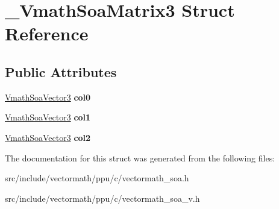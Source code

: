 \hypertarget{struct__VmathSoaMatrix3}{\section{\-\_\-\-Vmath\-Soa\-Matrix3 Struct Reference}
\label{struct__VmathSoaMatrix3}
}
\subsection*{Public Attributes}
\begin{DoxyCompactItemize}
\item 
\hypertarget{struct__VmathSoaMatrix3_a2cbc762d8f354344eb4dcfbeb387418c}{\hyperlink{struct__VmathSoaVector3}{Vmath\-Soa\-Vector3} {\bfseries col0}}\label{struct__VmathSoaMatrix3_a2cbc762d8f354344eb4dcfbeb387418c}

\item 
\hypertarget{struct__VmathSoaMatrix3_abcadb8e2df0b19c7c4f51dae3baaa063}{\hyperlink{struct__VmathSoaVector3}{Vmath\-Soa\-Vector3} {\bfseries col1}}\label{struct__VmathSoaMatrix3_abcadb8e2df0b19c7c4f51dae3baaa063}

\item 
\hypertarget{struct__VmathSoaMatrix3_a7dd4758714cae8483b016e8d233a72a3}{\hyperlink{struct__VmathSoaVector3}{Vmath\-Soa\-Vector3} {\bfseries col2}}\label{struct__VmathSoaMatrix3_a7dd4758714cae8483b016e8d233a72a3}

\end{DoxyCompactItemize}


The documentation for this struct was generated from the following files\-:\begin{DoxyCompactItemize}
\item 
src/include/vectormath/ppu/c/vectormath\-\_\-soa.\-h\item 
src/include/vectormath/ppu/c/vectormath\-\_\-soa\-\_\-v.\-h\end{DoxyCompactItemize}

